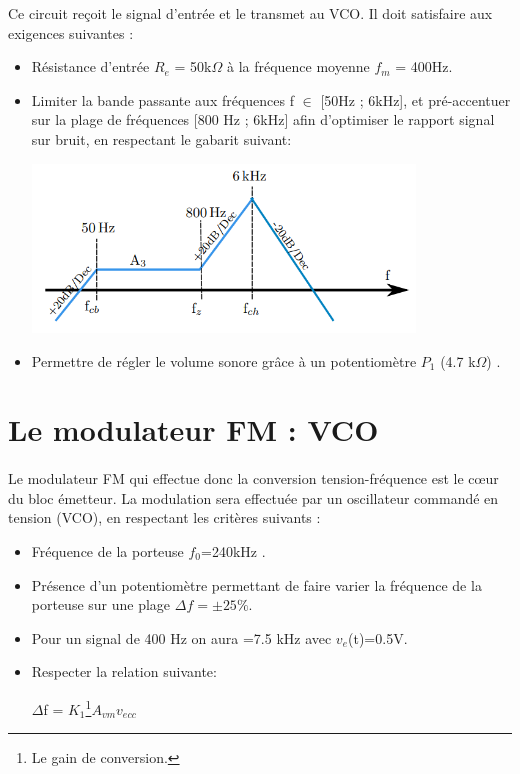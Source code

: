 \documentclass[a4paper]{report}
\begin{document}
Ce circuit reçoit le signal d'entrée et le transmet au VCO. Il doit satisfaire aux exigences suivantes :  
\begin{itemize}
	\item Résistance d'entrée $R_e$ = 50k$\Omega$ à la fréquence moyenne $f_m$ = 400Hz.

	\item Limiter la bande passante aux fréquences f $\in$ [50Hz ; 6kHz], et pré-accentuer sur la plage de fréquences [800 Hz ; 6kHz] afin d'optimiser le rapport signal sur bruit, en respectant le gabarit suivant:\\

\begin{center}
\includegraphics[width=0.8\textwidth]{gabarit.PNG}
\end{center}

	\item Permettre de régler le volume sonore grâce à un potentiomètre $P_1$ (4.7 k$\Omega$) .
	
\end{itemize}

\section{Le modulateur FM : VCO}
\paragraph{}
Le modulateur FM qui effectue donc la conversion tension-fréquence est le cœur du bloc émetteur. La modulation sera effectuée par un oscillateur commandé en tension (VCO), en respectant les critères suivants :
\begin{itemize}
\item Fréquence de la porteuse $f_0$=240kHz .
\item Présence d’un potentiomètre permettant de faire varier la fréquence de la porteuse sur une plage $\Delta f=\pm 25 \%$.
\item Pour un signal de 400 Hz on aura =7.5 kHz avec $v_e$(t)=0.5V.
\item Respecter la relation suivante:
\begin{center}
$\Delta$f = $K_1$\footnote{Le gain de conversion.}$A_{vm}$$v_{ecc}$
\end{center}
\end{itemize}
\end{document}
